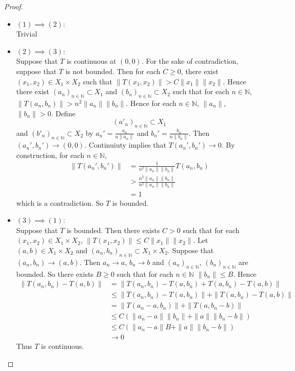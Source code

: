 \documentclass[12pt]{amsart}
\theoremstyle{definition}
\newcommand{\N}{\mathbb{N}}
\DeclareMathOperator*{\0}{\mbf{0}}
\DeclareMathOperator*{\1}{\mbf{1}}
\begin{document}
	\begin{proof}\
		\begin{itemize}
		\item $(1) \implies (2)$:\\
		Trivial
		\item  $(2) \implies (3)$:\\ 
		Suppose that $T$ is continuous at $(0, 0)$. For the sake of contradiction, suppose that $T$ is not bounded. Then for each $C \geq 0$, there exist $(x_1, x_2) \in X_1 \times X_2$ such that $\|T(x_1, x_2)\| > C\|x_1\| \|x_2\|$. Hence there exist $(a_n)_{n \in \N} \subset X_1$ and $(b_n)_{n \in \N} \subset X_2$ such that for each $n \in \N$, $ \| T(a_n, b_n) \| > n^2 \|a_n\| \|b_n\|$. Hence for each $n \in \N$, $\|a_n\|$, $\|b_n\| > 0$. Define $$(a'_n)_{n \in \N} \subset X_1$$ and $(b'_n)_{n \in \N} \subset X_2$ by $a_n' = \frac{a_n}{n\|a_n\|}$ and $b_n' = \frac{b_n}{n\|b_n\|}$. Then $(a_n', b_n') \rightarrow (0,0)$. Continuiuty implies that $T(a_n',b_n') \rightarrow 0$. By construction, for each $n \in \N$,
		\begin{align*}
		\|T(a_n',b_n')\| 
		&= \frac{1}{n^2 \|a_n\| \|b_n\|} T(a_n, b_n) \\
		& > \frac{n^2 \|a_n\| \|b_n\|}{n^2 \|a_n\| \|b_n\|} \\
		&= 1
		\end{align*}
		which is a contradiction. So $T$ is bounded.
		\item  $(3) \implies (1)$:\\ 
		Suppose that $T$ is bounded. Then there exists $C > 0$ such that for each $(x_1, x_2) \in X_1 \times X_2$, $\| T(x_1, x_2) \| \leq C\|x_1\| \|x_2\|$. Let $(a, b) \in X_1 \times X_2$ and $(a_n, b_n)_{n \in \N} \subset X_1 \times X_2$. Suppose that $(a_n, b_n) \rightarrow (a,b)$. Then $a_n \rightarrow a$, $b_n \rightarrow b$ and $(a_n)_{n \in \N}$, $(b_n)_{n \in \N}$ are bounded. So there exists $B \geq 0$ such that for each $n \in \N$ $\|b_n\| \leq B$. Hence 
		\begin{align*}
		\|T(a_n,b_n) - T(a,b) \|
		&= \|T(a_n,b_n) - T(a, b_n) + T(a, b_n) - T(a,b) \| \\
		& \leq \|T(a_n,b_n) - T(a, b_n) \| + \|T(a, b_n) - T(a,b) \| \\
		&= \|T(a_n - a,b_n) \| + \|T(a, b_n - b)\| \\
		& \leq C(\|a_n - a\| \|b_n\| + \|a\|\|b_n - b\|) \\
		& \leq C(\|a_n - a\| B + \|a\|\|b_n - b\|) \\
		& \rightarrow 0
		\end{align*}
		Thus $T$ is continuous. 
		\end{itemize}
	\end{proof}
	
\end{document}
